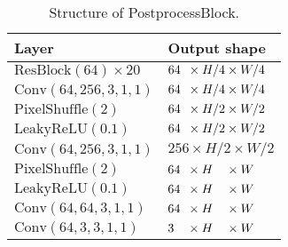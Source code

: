 \documentclass[final]{cvpr}
\begin{document}
\begin{table}[ht]
    \setlength{\tabcolsep}{6pt}
    \centering
    \begin{tabular}{ll}
        \toprule
        Layer                                       &  Output shape\\
        \midrule
        $\text{ResBlock}(64) \times 20$             &  $64\hphantom{0} \times H/4 \times W/4$\\
        $\text{Conv}(64, 256, 3, 1, 1)$             &  $64\hphantom{0} \times H/4 \times W/4$\\
        $\text{PixelShuffle}(2)$                    &  $64\hphantom{0} \times H/2 \times W/2$\\
        $\text{LeakyReLU}(0.1)$                     &  $64\hphantom{0} \times H/2 \times W/2$\\
        $\text{Conv}(64, 256, 3, 1, 1)$             &  
        $256 \times H/2 \times W/2$\\
        $\text{PixelShuffle}(2)$                    &  $64\hphantom{0} \times H\hphantom{/1} \times W$\\
        $\text{LeakyReLU}(0.1)$                     &  $64\hphantom{0} \times H\hphantom{/1} \times W$\\
        $\text{Conv}(64, 64, 3, 1, 1)$              &  $64\hphantom{0} \times H\hphantom{/1} \times W$\\
        $\text{Conv}(64, 3, 3, 1, 1)$               &  
        $3\hphantom{00}\times H\hphantom{/1} \times W$\\
        
        \bottomrule
    \end{tabular}
    \caption{Structure of PostprocessBlock.}
    \label{tab:reconstructor}
\end{table}
\end{document}
